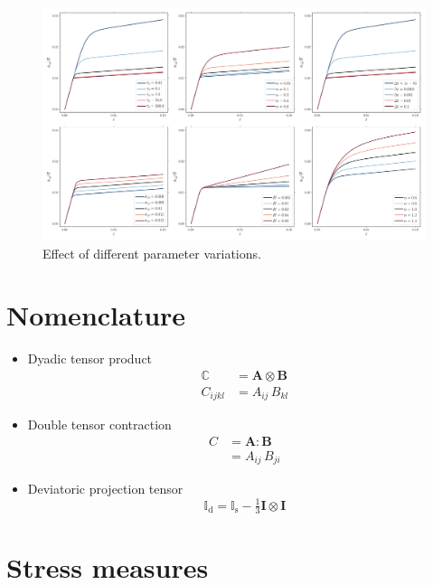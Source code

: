 \documentclass[times,namecite]{goose-article}
\begin{document}
\begin{figure}[htp]
  \centering
  \includegraphics[width=1.\textwidth]{parameters}
  \caption{Effect of different parameter variations.}
  \label{fig:parameter}
\end{figure}

\appendix
\vfill\newpage

\section{Nomenclature}
\label{sec:nomenclature}

\begin{itemize}
%
\item Dyadic tensor product
\begin{align}
  \mathbb{C} &= \bm{A} \otimes \bm{B} \\
  C_{ijkl}   &= A_{ij} \,      B_{kl}
\end{align}
%
\item Double tensor contraction
\begin{align}
  C &= \bm{A} : \bm{B} \\
    &= A_{ij} \, B_{ji}
\end{align}
%
\item Deviatoric projection tensor
%
\begin{equation}
  \mathbb{I}_\mathrm{d}
  = \mathbb{I}_\mathrm{s} - \tfrac{1}{3} \bm{I} \otimes \bm{I}
\end{equation}
%
\end{itemize}

\section{Stress measures}
\label{sec:ap:stress}
\end{document}
